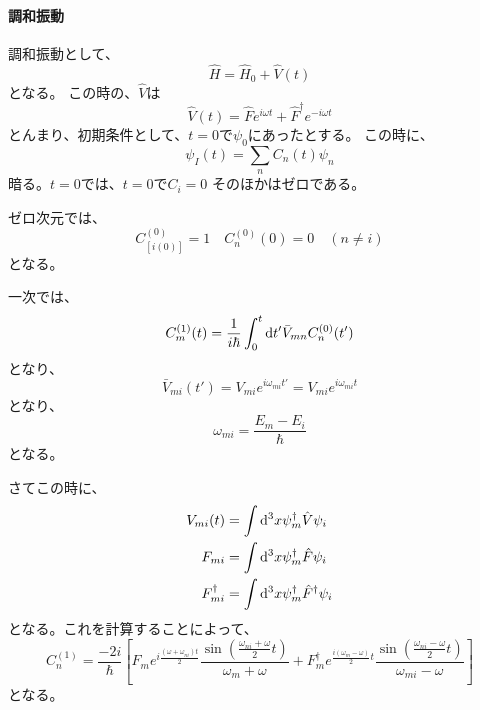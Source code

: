 \documentclass[titlepage]{ltjsarticle}
\begin{document}







\paragraph{調和振動}
調和振動として、
\begin{equation}
  \hat{H} = \hat{H}_0 + \hat{V}(t)
\end{equation}
となる。
この時の、\(\hat{V}\)は
\begin{equation}
  \hat{V}(t) = \hat{F} e^{i\omega t} + \hat{F}^\dagger e^{-i\omega t}
\end{equation}
とんまり、初期条件として、\(t=0\)で\(\psi_0\)にあったとする。
この時に、
\begin{equation}
  \psi_I(t) = \sum_n C_n(t) \psi_n
\end{equation}
暗る。\(t=0\)では、\(t=0\)で\(C_i = 0\) そのほかはゼロである。

ゼロ次元では、
\begin{equation}
  C^{(0)}_[i(0)] = 1 \quad C^{(0)}_n(0) = 0 \quad (n\ne i)
\end{equation}
となる。

一次では、
\begin{equation}
  C^{(1)}_m(t) = \frac{1}{i \hbar} \int_{0}^{t} \odif{t'} \bar{V}_{mn} C^{(0)}_n(t')
\end{equation}
となり、
\begin{equation}
  \bar{V}_{mi}(t') = V_{mi} e^{i\omega_{mi}t'} = V_{mi} e^{i\omega_{mi}t}
\end{equation}
となり、
\begin{equation}
  \omega_{mi} = \frac{E_m - E_i}{\hbar}
\end{equation}
となる。

さてこの時に、
\begin{align}
  V_{mi}(t) & = \int \odif[order=3]{x} \psi^\dagger_m \hat{V} \psi_i\\
  F_{mi} & = \int \odif[order=3]{x} \psi^\dagger_m \hat{F} \psi_i\\
  F_{mi}^\dagger & = \int \odif[order=3]{x} \psi^\dagger_m \hat{F}^\dagger \psi_i
\end{align}
となる。これを計算することによって、
\begin{equation}
  C_n^{(1)} = \frac{-2i}{\hbar} \left[ F_m e^{i\frac{(\omega + \omega_{ni})t}{2}} \frac{\sin \left( \frac{\omega_{ni}+\omega}{2}t \right)}{\omega_m + \omega} + F^\dagger_m e^{\frac{i(\omega_m-\omega)}{2}t}\frac{\sin \left( \frac{\omega_{ni}-\omega}{2}t \right)}{\omega_{mi}-\omega} \right]
\end{equation}
となる。
\end{document}
